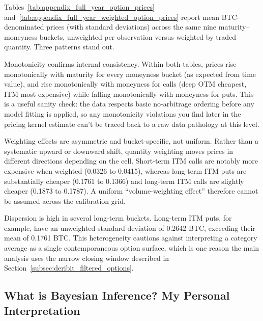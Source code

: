\documentclass[11pt]{article}
\begin{document}
Tables~\ref{tab:appendix_full_year_option_prices} and~\ref{tab:appendix_full_year_weighted_option_prices} report mean BTC-denominated prices (with standard deviations) across the same nine maturity--moneyness buckets, unweighted per observation versus weighted by traded quantity. Three patterns stand out.

Monotonicity confirms internal consistency. Within both tables, prices rise monotonically with maturity for every moneyness bucket (as expected from time value), and rise monotonically with moneyness for calls (deep OTM cheapest, ITM most expensive) while falling monotonically with moneyness for puts. This is a useful sanity check: the data respects basic no-arbitrage ordering before any model fitting is applied, so any monotonicity violations you find later in the pricing kernel estimate can't be traced back to a raw data pathology at this level.

Weighting effects are asymmetric and bucket-specific, not uniform. Rather than a systematic upward or downward shift, quantity weighting moves prices in different directions depending on the cell. Short-term ITM calls are notably more expensive when weighted (0.0326 to 0.0415), whereas long-term ITM puts are substantially cheaper (0.1761 to 0.1366) and long-term ITM calls are slightly cheaper (0.1873 to 0.1787). A uniform ``volume-weighting effect'' therefore cannot be assumed across the calibration grid.

Dispersion is high in several long-term buckets. Long-term ITM puts, for example, have an unweighted standard deviation of 0.2642 BTC, exceeding their mean of 0.1761 BTC. This heterogeneity cautions against interpreting a category average as a single contemporaneous option surface, which is one reason the main analysis uses the narrow closing window described in Section~\ref{subsec:deribit_filtered_options}.
\clearpage
    \subsection*{What is Bayesian Inference? My Personal Interpretation}
\end{document}
